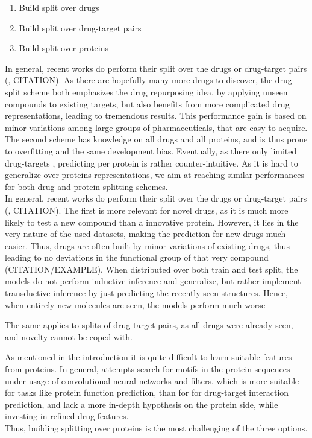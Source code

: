 \documentclass{bioinfo}
\renewcommand{\cite}{\citep}
\begin{document}
\begin{enumerate}
	\item Build split over drugs
	\item Build split over drug-target pairs
	\item Build split over proteins
\end{enumerate} 
In general, recent works do perform their split over the drugs or drug-target pairs (\cite{Survey2018}, CITATION). As there are hopefully many more drugs to discover, the drug split scheme both emphasizes the drug repurposing idea, by applying unseen compounds to existing targets, but also benefits from more complicated drug representations, leading to tremendous results. This performance gain is based on minor variations among large groups of pharmaceuticals, that are easy to acquire. The second scheme has knowledge on all drugs and all proteins, and is thus prone to overfitting and the same development bias. Eventually, as there only limited drug-targets \citep{Overington2006}, predicting per protein is rather counter-intuitive. As it is hard to generalize over proteins representations, we aim at reaching similar performances for both drug and protein splitting schemes. \\

In general, recent works do perform their split over the drugs or drug-target pairs (\cite{Survey2018}, CITATION). The first is more relevant for novel drugs, as it is much more likely to test a new compound than a innovative protein. However, it lies in the very nature of the used datasets, making the prediction for new drugs much easier. Thus, drugs are often built by minor variations of existing drugs, thus leading to no deviations in the functional group of that very compound (CITATION/EXAMPLE). When distributed over both train and test split, the models do not perform inductive inference and generalize, but rather implement transductive inference by just predicting the recently seen structures. Hence, when entirely new molecules are seen, the models perform much worse

The same applies to splits of drug-target pairs, as all drugs were already seen, and novelty cannot be coped with.

As mentioned in the introduction it is quite difficult to learn suitable features from proteins. In general, attempts search for motifs in the protein sequences under usage of convolutional neural networks and filters, which is more suitable for tasks like protein function prediction, than for for drug-target interaction prediction, and lack a more in-depth hypothesis on the protein side, while investing in refined drug features. \\
Thus, building splitting over proteins is the most challenging of the three options. \\
\end{document}
